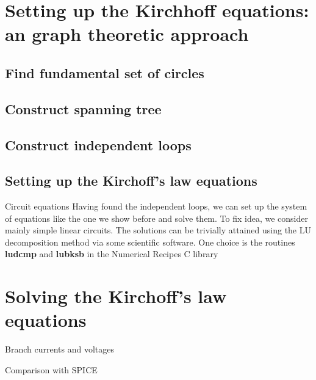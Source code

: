 \documentclass[xcolor=dvipsnames]{beamer}
\begin{document}
\section{Setting up the Kirchhoff equations: an graph theoretic approach }

\subsection{Find fundamental set of circles}

\subsection{Construct spanning tree}

\subsection{Construct independent loops}

\subsection{Setting up the Kirchoff's law equations}

\begin{frame}{Circuit equations}
	Having found the independent loops, we can set up the system of equations like the one we show before and solve them. To fix idea,
	we consider mainly simple linear circuits. The solutions can be trivially attained using the LU decomposition method via some scientific software. 
	One choice is the routines \textbf{ludcmp} and \textbf{lubksb} in the Numerical Recipes C library
\end{frame}

\section{Solving the Kirchoff's law equations}

\begin{frame}{Branch currents and voltages}
	
\end{frame}

\begin{frame}{Comparison with SPICE}
	
\end{frame}
\end{document}

